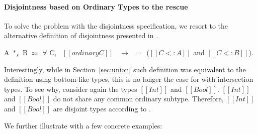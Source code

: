 \paragraph{Disjointness based on Ordinary Types to the rescue}
To solve the problem with the disjointness specification, we resort to
the alternative definition of disjointness presented in .

\begin{definition}
\label{def:inter:disj}
  A $*_s$ B $\Coloneqq$ $\forall$ C, \ $[[ordinary C]]$ \ $\rightarrow$ \ $\neg$ \ ($[[C <: A]]$ and $[[C <: B]]$).
\end{definition}

Interestingly, while in Section~\ref{sec:union} such definition was
equivalent to the definition using bottom-like types, this is no
longer the case for \name with intersection types. To see why,
consider again the types $[[Int]]$ and $[[Bool]]$.  $[[Int]]$ and
$[[Bool]]$ do not share any common ordinary subtype. Therefore,
$[[Int]]$ and $[[Bool]]$ are disjoint types according to
.
\begin{comment}
We extend our previous example of type $[[Int]]$ and type $[[Bool]]$ and show how
disjointness based upon ordinary types categorize them as disjoint types.
An important observation at this point is common subtypes of type $[[Int]]$ and type $[[Bool]]$
cannot include either $[[Int]]$ or $[[Bool]]$. Problematic types are the intersection types
such as $[[Int /\ Bool]]$. We empahsize the point that ordinary types in \cal does not contain
intersection types. Further, all ordinary types are non-overlapping in \cal.
Therefore, now we say that
two types are disjoint if they do not have any common ordinary subtype. $[[Int]]$ and $[[Bool]]$
do not share any common ordinary subtype. Therefore, $[[Int]]$ and $[[Bool]]$ are disjoint types.
\Cref{def:inter:disj} shows the declarative disjointness for \cal with intersection types:


\noindent Two types $[[A]]$ and $[[B]]$ are
disjoint if the two types $[[A /\ B]]$ do
not have any common ordinary subtype. For example, $[[Int]]$ and $[[A -> B]]$
are disjoint types because there is no ordinary type that is a subtype
of both types ($[[Int]]$ and $[[A -> B]]$).
\Cref{def:inter:disj} is the same as 
\Cref{def:union:disj1}. However, while the \Cref{def:union:disj1} in \Cref{sec:union:discussion}
is equivalent the definition of disjointness using bottom-like types (\Cref{def:union:disj}),
in the calculus with intersection types that is no longer the case.
\end{comment}
We further illustrate  
 with a few concrete examples:

